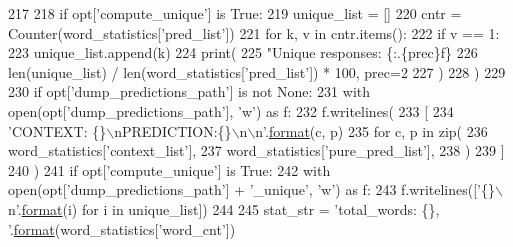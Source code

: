 \begin{DoxyCode}
{217 
218     \textcolor{keywordflow}{if} opt[\textcolor{stringliteral}{'compute\_unique'}] \textcolor{keywordflow}{is} \textcolor{keyword}{True}:
219         unique\_list = []
220         cntr = Counter(word\_statistics[\textcolor{stringliteral}{'pred\_list'}])
221         \textcolor{keywordflow}{for} k, v \textcolor{keywordflow}{in} cntr.items():
222             \textcolor{keywordflow}{if} v == 1:
223                 unique\_list.append(k)
224         print(
225             \textcolor{stringliteral}{"Unique responses: \{:.\{prec\}f\}%
226                 len(unique\_list) / len(word\_statistics[\textcolor{stringliteral}{'pred\_list'}]) * 100, prec=2
227             )
228         )
229 
230     \textcolor{keywordflow}{if} opt[\textcolor{stringliteral}{'dump\_predictions\_path'}] \textcolor{keywordflow}{is} \textcolor{keywordflow}{not} \textcolor{keywordtype}{None}:
231         with open(opt[\textcolor{stringliteral}{'dump\_predictions\_path'}], \textcolor{stringliteral}{'w'}) \textcolor{keyword}{as} f:
232             f.writelines(
233                 [
234                     \textcolor{stringliteral}{'CONTEXT: \{\}\(\backslash\)nPREDICTION:\{\}\(\backslash\)n\(\backslash\)n'}.\hyperlink{namespaceparlai_1_1chat__service_1_1services_1_1messenger_1_1shared__utils_a32e2e2022b824fbaf80c747160b52a76}{format}(c, p)
235                     \textcolor{keywordflow}{for} c, p \textcolor{keywordflow}{in} zip(
236                         word\_statistics[\textcolor{stringliteral}{'context\_list'}],
237                         word\_statistics[\textcolor{stringliteral}{'pure\_pred\_list'}],
238                     )
239                 ]
240             )
241         \textcolor{keywordflow}{if} opt[\textcolor{stringliteral}{'compute\_unique'}] \textcolor{keywordflow}{is} \textcolor{keyword}{True}:
242             with open(opt[\textcolor{stringliteral}{'dump\_predictions\_path'}] + \textcolor{stringliteral}{'\_unique'}, \textcolor{stringliteral}{'w'}) \textcolor{keyword}{as} f:
243                 f.writelines([\textcolor{stringliteral}{'\{\}\(\backslash\)n'}.\hyperlink{namespaceparlai_1_1chat__service_1_1services_1_1messenger_1_1shared__utils_a32e2e2022b824fbaf80c747160b52a76}{format}(i) \textcolor{keywordflow}{for} i \textcolor{keywordflow}{in} unique\_list])
244 
245     stat\_str = \textcolor{stringliteral}{'total\_words: \{\}, '}.\hyperlink{namespaceparlai_1_1chat__service_1_1services_1_1messenger_1_1shared__utils_a32e2e2022b824fbaf80c747160b52a76}{format}(word\_statistics[\textcolor{stringliteral}{'word\_cnt'}])
}}
\end{DoxyCode}
